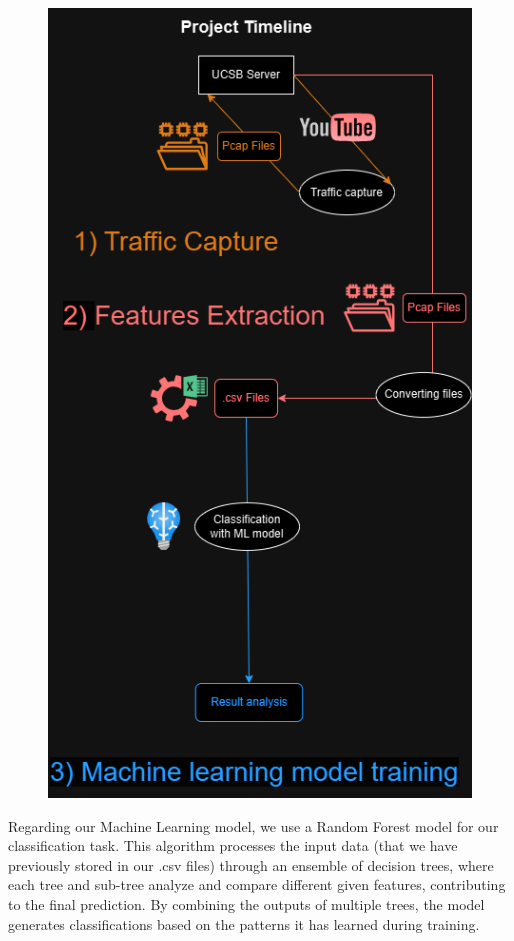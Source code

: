 \begin{figure}[ht]
    \centering
    \includegraphics[width=1.0\linewidth]{timeline_diagram.png}
    \label{fig:your_label}
\end{figure}


Regarding our Machine Learning model, we use a Random Forest model for our classification task. This algorithm processes the input data (that we have previously stored in our .csv files) through an ensemble of decision trees, where each tree and sub-tree analyze and compare different given features, contributing to the final prediction. By combining the outputs of multiple trees, the model generates classifications based on the patterns it has learned during training.

